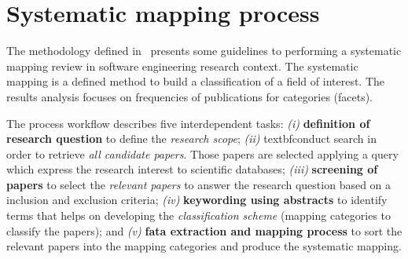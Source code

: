 \section{Systematic mapping process}\label{sec:sm}

The methodology defined in~\cite{SM:Petersen:2008} presents some guidelines to
performing a systematic mapping review in software engineering research
context. The systematic mapping is a defined method to build
a classification of a field of interest. The results analysis focuses on
frequencies of publications for categories (facets).  

The process workflow describes five interdependent tasks: \textit{(i)}
\textbf{definition of research question} to define the \textit{research scope}; \textit{(ii)} textbf{conduct search} in
order to retrieve \textit{all candidate papers}. Those papers are selected applying a query which
express the research interest to scientific databases; \textit{(iii)}
\textbf{screening of papers} to select the \textit{relevant papers} to answer the research
question based on a inclusion and exclusion criteria; \textit{(iv)}
\textbf{keywording using abstracts} to identify terms that helps on developing the
\textit{classification scheme} (mapping categories to classify the papers); and
\textit{(v)} \textbf{fata extraction and mapping process} to sort the relevant
papers into the mapping categories and produce the systematic mapping.

 

